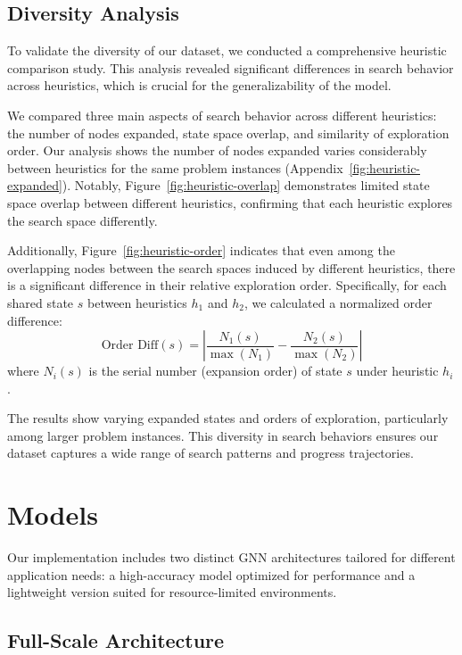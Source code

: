\documentclass[letterpaper]{article}
\begin{document}
\subsection{Diversity Analysis}

To validate the diversity of our dataset, we conducted a comprehensive heuristic comparison study. This analysis revealed significant differences in search behavior across heuristics, which is crucial for the generalizability of the model.

We compared three main aspects of search behavior across different heuristics: the number of nodes expanded, state space overlap, and similarity of exploration order.
Our analysis shows the number of nodes expanded varies considerably between heuristics for the same problem instances (Appendix~\ref{fig:heuristic-expanded}). Notably, Figure~\ref{fig:heuristic-overlap} demonstrates limited state space overlap between different heuristics, confirming that each heuristic explores the search space differently.

Additionally, Figure~\ref{fig:heuristic-order} indicates that even among the overlapping nodes between the search spaces induced by different heuristics, there is a significant difference in their relative exploration order. Specifically, for each shared state $s$ between heuristics $h_1$ and $h_2$, we calculated a normalized order difference:
\begin{equation}\label{eq:order-diff}
    \text{Order Diff}(s) = \left|\frac{N_1(s)}{\max(N_1)} - \frac{N_2(s)}{\max(N_2)}\right|
\end{equation}
where $N_i(s)$ is the serial number (expansion order) of state $s$ under heuristic $h_i$.

The results show varying expanded states and orders of exploration, particularly among larger problem instances. This diversity in search behaviors ensures our dataset captures a wide range of search patterns and progress trajectories.

\section{Models} \label{sec:models}

Our implementation includes two distinct GNN architectures tailored for different application needs: a high-accuracy model optimized for performance and a lightweight version suited for resource-limited environments.

\subsection{Full-Scale Architecture}
\end{document}
